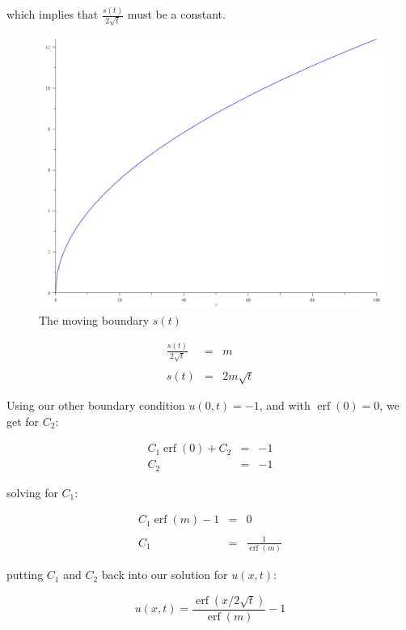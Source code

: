\documentclass{report}
\DeclareMathOperator{\erf}{erf}
\begin{document}
which implies that $\frac{s(t)}{2 \sqrt{t}}$ must be a constant.\bigskip

\begin{figure}[b]
\centering
\includegraphics[scale = 0.15]{s-vs-t}
\caption{The moving boundary $s(t)$}
\label{fig:s-vs-t}
\end{figure}

\begin{eqnarray*}
  \frac{s(t)}{2 \sqrt{t}} & = & m \\\\
                     s(t) & = & 2 m \sqrt{t}
\end{eqnarray*}\medskip

Using our other boundary condition $u(0, t) = -1$, and with $\erf ( 0 ) = 0$, we get for $C_2$:\bigskip

\begin{eqnarray*}
  C_1 \erf ( 0 ) + C_2 & = & -1 \\
                   C_2 & = & -1
\end{eqnarray*}\medskip

solving for $C_1$:\bigskip

\begin{eqnarray*}
  C_1 \erf (m) - 1 & = & 0 \\\\
               C_1 & = & \frac{1}{\erf(m)}
\end{eqnarray*}\medskip

putting $C_1$ and $C_2$ back into our solution for $u(x, t)$:\bigskip

\[ u(x, t) = \frac{ \erf ( x / 2 \sqrt{t} ) }{\erf(m)} - 1 \]\medskip
\end{document}
